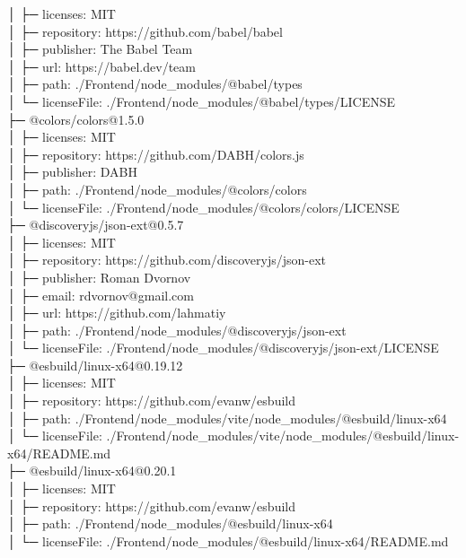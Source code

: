 \documentclass[
    paper=a4,
    twoside=false,
    parskip=half,
    listof=entryprefix,
    listof=totoc,
    index=totoc,
    bibliography=totoc,
    headsepline,
]{scrbook}
\begin{document}
    │  ├─ licenses: MIT\\
    │  ├─ repository: https://github.com/babel/babel\\
    │  ├─ publisher: The Babel Team\\
    │  ├─ url: https://babel.dev/team\\
    │  ├─ path: ./Frontend/node\_modules/@babel/types\\
    │  └─ licenseFile: ./Frontend/node\_modules/@babel/types/LICENSE\\
    ├─ @colors/colors@1.5.0\\
    │  ├─ licenses: MIT\\
    │  ├─ repository: https://github.com/DABH/colors.js\\
    │  ├─ publisher: DABH\\
    │  ├─ path: ./Frontend/node\_modules/@colors/colors\\
    │  └─ licenseFile: ./Frontend/node\_modules/@colors/colors/LICENSE\\
    ├─ @discoveryjs/json-ext@0.5.7\\
    │  ├─ licenses: MIT\\
    │  ├─ repository: https://github.com/discoveryjs/json-ext\\
    │  ├─ publisher: Roman Dvornov\\
    │  ├─ email: rdvornov@gmail.com\\
    │  ├─ url: https://github.com/lahmatiy\\
    │  ├─ path: ./Frontend/node\_modules/@discoveryjs/json-ext\\
    │  └─ licenseFile: ./Frontend/node\_modules/@discoveryjs/json-ext/LICENSE\\
    ├─ @esbuild/linux-x64@0.19.12\\
    │  ├─ licenses: MIT\\
    │  ├─ repository: https://github.com/evanw/esbuild\\
    │  ├─ path: ./Frontend/node\_modules/vite/node\_modules/@esbuild/linux-x64\\
    │  └─ licenseFile: ./Frontend/node\_modules/vite/node\_modules/@esbuild/linux-x64/README.md\\
    ├─ @esbuild/linux-x64@0.20.1\\
    │  ├─ licenses: MIT\\
    │  ├─ repository: https://github.com/evanw/esbuild\\
    │  ├─ path: ./Frontend/node\_modules/@esbuild/linux-x64\\
    │  └─ licenseFile: ./Frontend/node\_modules/@esbuild/linux-x64/README.md\\
\end{document}
